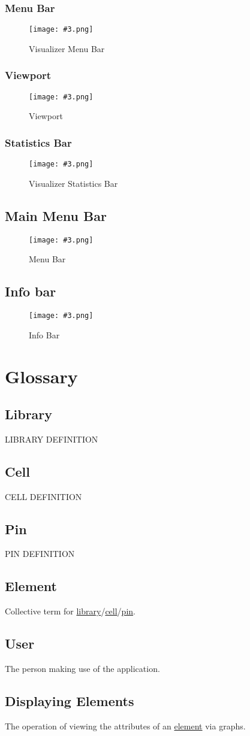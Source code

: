 \documentclass[10pt,a4paper]{report}
\newcommand{\refer}[2]{\hyperref[#1]{\textcolor{col:reference}{#2}}}
\newcommand{\defg}[3]{\label{glo:#1}\section{#2}#3\\}
\newcommand{\refg}[2]{\refer{glo:#1}{#2}}
\newcommand{\includeimage}[5]{
    \begin{figure}[H]
        #1
        \texttt{[image: \#3.png]}
        \caption{#4}
        \label{fig:#5}
    \end{figure}
}
\begin{document}
\subsection{Menu Bar}
\label{sec:visualizer:menu}

\includeimage{}{0.4}{Visualizer Menu Bar}{Visualizer Menu Bar}{visualizer_menu_bar}

\subsection{Viewport}
\label{sec:visualizer:viewport}

\includeimage{}{0.4}{Viewport}{Viewport}{viewport}

\subsection{Statistics Bar}
\label{sec:visualizer:statistics}

\includeimage{}{0.4}{Visualizer Statistics Bar}{Visualizer Statistics Bar}{visualizer_statistics_bar}

\section{Main Menu Bar}
\label{sec:menu}

\includeimage{}{0.4}{Menu Bar}{Menu Bar}{menu_bar}

\section{Info bar}
\label{sec:info}

\includeimage{}{0.4}{Info Bar}{Info Bar}{info_bar}

\chapter{Glossary}
\defg{library}{Library}{
    LIBRARY DEFINITION
}
\defg{cell}{Cell}{
    CELL DEFINITION
}
\defg{pin}{Pin}{
    PIN DEFINITION
}
\defg{element}{Element}{
    Collective term for \refg{library}{library}/\refg{cell}{cell}/\refg{pin}{pin}.
}
\defg{user}{User}{
    The person making use of the application.
}
\defg{display_element}{Displaying Elements}{
    The operation of viewing the attributes of an \refg{element}{element} via graphs.
}
\end{document}
